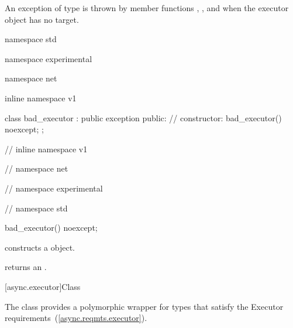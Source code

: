 %
\pnum
An exception of type  is thrown by  member functions , , and  when the executor object has no target.

\begin{codeblock}
namespace std {
namespace experimental {
namespace net {
inline namespace v1 {

  class bad_executor : public exception
  {
  public:
    // constructor:
    bad_executor() noexcept;
  };

} // inline namespace v1
} // namespace net
} // namespace experimental
} // namespace std
\end{codeblock}

\begin{itemdecl}
bad_executor() noexcept;
\end{itemdecl}

\begin{itemdescr}
\pnum
\effects constructs a  object.

\pnum
\postconditions
{} returns an  \ntbs.
\end{itemdescr}



[async.executor]{Class }

%
\pnum
The  class provides a polymorphic wrapper for types that satisfy the Executor requirements~(\ref{async.reqmts.executor}).

